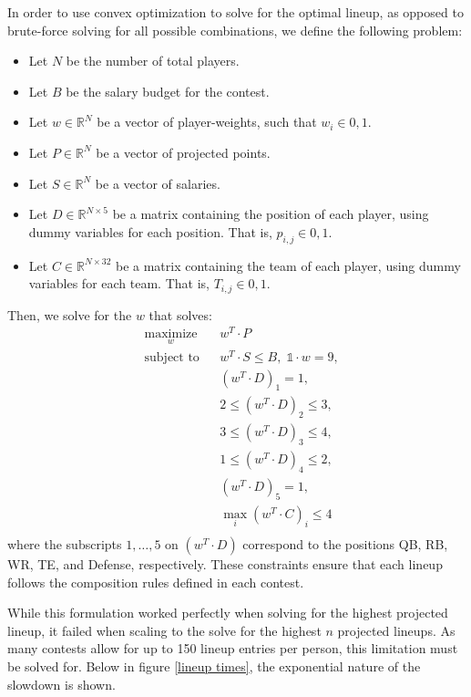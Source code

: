 \documentclass[12pt]{article}
\begin{document}
In order to use convex optimization to solve for the optimal lineup, as opposed to brute-force solving for all possible combinations, we define the following problem: \begin{itemize}
	\item Let $N$ be the number of total players.
	\item Let $B$ be the salary budget for the contest.
	\item Let $w \in \mathbb{R}^{N}$ be a vector of player-weights, such that $w_i \in {0, 1}$.
	\item Let $P \in \mathbb{R}^{N}$ be a vector of projected points.
	\item Let $S \in \mathbb{R}^{N}$ be a vector of salaries.
	\item Let $D \in \mathbb{R}^{N \times 5}$ be a matrix containing the position of  each player, using dummy variables for each position. That is, $p_{i, j} \in {0, 1}$.
	\item Let $C \in \mathbb{R}^{N \times 32}$ be a matrix containing the team of each player, using dummy variables for each team. That is, $T_{i, j} \in {0, 1}$.
\end{itemize}
Then, we solve for the $w$ that solves:
\begin{equation*}
\begin{aligned}
& \underset{w}{\text{maximize}}
& & w^T \cdot P \\
& \text{subject to}
& & w^T \cdot S \leq B, \; \mathds{1} \cdot w = 9, \\
&&& (w^T \cdot D)_1 = 1, \\
&&& 2 \leq (w^T \cdot D)_2 \leq 3, \\
&&& 3 \leq (w^T \cdot D)_3 \leq 4, \\
&&& 1 \leq (w^T \cdot D)_4 \leq 2, \\
&&& (w^T \cdot D)_5 = 1, \\ 
&&& \max_i (w^T \cdot C)_i \leq 4 \\
\end{aligned}
\end{equation*}
where the subscripts $1,\ldots ,5$ on $(w^T \cdot D)$ correspond to the positions QB, RB, WR, TE, and Defense, respectively. These constraints ensure that each lineup follows the composition rules defined in each contest.

While this formulation worked perfectly when solving for the highest projected lineup, it failed when scaling to the solve for the highest $n$ projected lineups. As many contests allow for up to 150 lineup entries per person, this limitation must be solved for. Below in figure \ref{lineup times}, the exponential nature of the slowdown is shown.
\end{document}
